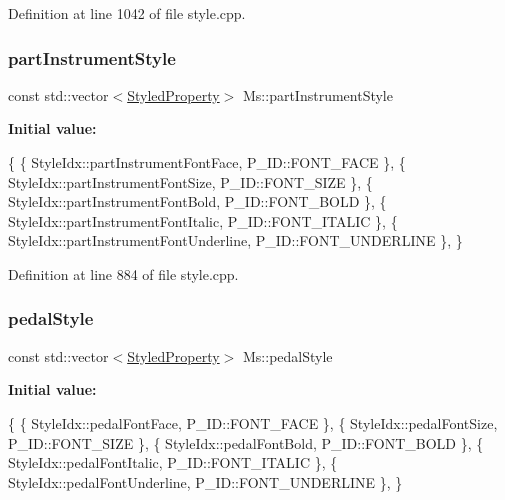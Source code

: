 Definition at line 1042 of file style.\+cpp.

\mbox{\label{namespace_ms_a5a61585d67ef74361c1d1b5a5e478a15}} 
\subsubsection{\texorpdfstring{part\+Instrument\+Style}{partInstrumentStyle}}
{\footnotesize\ttfamily const std\+::vector$<$\hyperlink{struct_ms_1_1_styled_property}{Styled\+Property}$>$ Ms\+::part\+Instrument\+Style}

{\bfseries Initial value\+:}
\begin{DoxyCode}
\{
      \{ StyleIdx::partInstrumentFontFace,             P\_ID::FONT\_FACE              \},
      \{ StyleIdx::partInstrumentFontSize,             P\_ID::FONT\_SIZE              \},
      \{ StyleIdx::partInstrumentFontBold,             P\_ID::FONT\_BOLD              \},
      \{ StyleIdx::partInstrumentFontItalic,           P\_ID::FONT\_ITALIC            \},
      \{ StyleIdx::partInstrumentFontUnderline,        P\_ID::FONT\_UNDERLINE         \},
      \}
\end{DoxyCode}


Definition at line 884 of file style.\+cpp.

\mbox{\label{namespace_ms_a6ee97313e002cf30989bd1418e8488f7}} 
\subsubsection{\texorpdfstring{pedal\+Style}{pedalStyle}}
{\footnotesize\ttfamily const std\+::vector$<$\hyperlink{struct_ms_1_1_styled_property}{Styled\+Property}$>$ Ms\+::pedal\+Style}

{\bfseries Initial value\+:}
\begin{DoxyCode}
\{
      \{ StyleIdx::pedalFontFace,                      P\_ID::FONT\_FACE              \},
      \{ StyleIdx::pedalFontSize,                      P\_ID::FONT\_SIZE              \},
      \{ StyleIdx::pedalFontBold,                      P\_ID::FONT\_BOLD              \},
      \{ StyleIdx::pedalFontItalic,                    P\_ID::FONT\_ITALIC            \},
      \{ StyleIdx::pedalFontUnderline,                 P\_ID::FONT\_UNDERLINE         \},
      \}
\end{DoxyCode}



